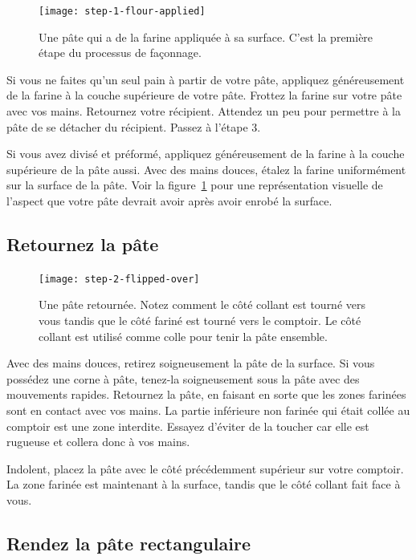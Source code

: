 \begin{figure}[!htb]
  \texttt{[image: step-1-flour-applied]}
  \caption[Step 1 of shaping process]{Une pâte qui a de la farine appliquée à sa
      surface. C'est la première étape du processus de façonnage.}%
  \label{fig:shaping-flour-surface}
\end{figure}

Si vous ne faites qu'un seul pain à partir de votre pâte, appliquez généreusement de la farine
à la couche supérieure de votre pâte. Frottez la farine sur votre
pâte avec vos mains. Retournez votre récipient. Attendez un peu
pour permettre à la pâte de se détacher du récipient. Passez
à l'étape 3.

Si vous avez divisé et préformé, appliquez généreusement de la farine à la couche supérieure de la pâte
aussi. Avec des mains douces, étalez la farine uniformément sur
la surface de la pâte. Voir la figure~\ref{fig:shaping-flour-surface} pour une
représentation visuelle de l'aspect que votre pâte devrait avoir après avoir enrobé
la surface.

\subsection[Retourner la pâte]{Retournez la pâte}

\begin{figure}[!htb]
  \texttt{[image: step-2-flipped-over]}
  \caption[Step 2 of shaping process]{Une pâte retournée. Notez comment le
      côté collant est tourné vers vous tandis que le côté fariné est tourné vers le
      comptoir. Le côté collant est utilisé comme colle pour tenir la pâte ensemble.}
\end{figure}

Avec des mains douces, retirez soigneusement la pâte de la surface. Si
vous possédez une corne à pâte, tenez-la soigneusement sous la pâte avec
des mouvements rapides. Retournez la pâte, en faisant en sorte que les zones farinées
sont en contact avec vos mains. La partie inférieure non farinée qui était
collée au comptoir est une zone interdite. Essayez d'éviter de la toucher
car elle est rugueuse et collera donc à vos mains.

Indolent, placez la pâte avec le côté précédemment supérieur
sur votre comptoir. La zone farinée est maintenant à la surface, tandis que le
côté collant fait face à vous.

\subsection[Créer une forme rectangulaire]{Rendez la pâte rectangulaire}

